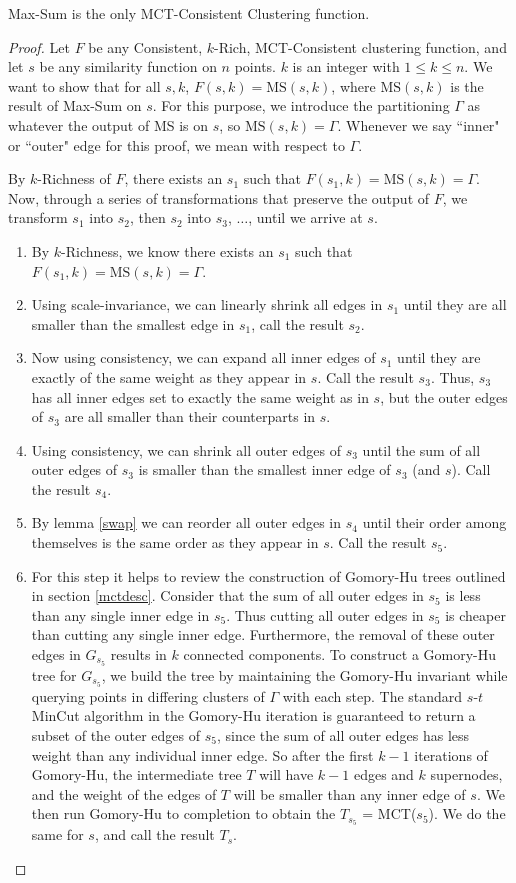 \documentclass[twoside,11pt]{article}
\newcommand{\MS}{\text{MS}}
\begin{document}
\begin{theorem} \label{mainms}
Max-Sum is the only MCT-Consistent Clustering function.
\end{theorem}
\begin{proof}
Let $F$ be any Consistent, $k$-Rich, MCT-Consistent clustering function, and let $s$ be any similarity function on $n$ points. $k$ is an integer with $1 \leq k \leq n$. We want to show that for all $s,k$, $F(s,k) = \MS(s,k)$, where $\MS(s,k)$ is the result of  Max-Sum on $s$. For this purpose, we introduce the partitioning $\Gamma$ as whatever the output of MS is on $s$, so $\MS(s,k)=\Gamma$. Whenever we say ``inner" or ``outer" edge for this proof, we mean with respect to $\Gamma$.

By $k$-Richness of $F$, there exists an $s_1$ such that $F(s_1,k) = \MS(s,k) = \Gamma$. Now, through a series of transformations that preserve the output of $F$, we transform $s_1$ into $s_2$, then $s_2$ into $s_3$, $\ldots$, until we arrive at $s$.
\begin{enumerate}
	\item By $k$-Richness, we know there exists an $s_1$ such that $F(s_1, k) = \MS(s, k) = \Gamma$.
	\item Using scale-invariance, we can linearly shrink all edges in $s_1$ until they are all smaller than the smallest edge in $s_1$, call the result $s_2$.
	\item Now using consistency, we can expand all inner edges of $s_1$ until they are exactly of the same weight as they appear in $s$. Call the result $s_3$. Thus, $s_3$ has all inner edges set to exactly the same weight as in $s$, but the outer edges of $s_3$ are all smaller than their counterparts in $s$.
	\item Using consistency, we can shrink all outer edges of $s_3$ until the sum of all outer edges of $s_3$ is smaller than the smallest inner edge of $s_3$ (and $s$). Call the result $s_4$.
	\item By lemma \ref{swap} we can reorder all outer edges in $s_4$ until their order among themselves is the same order as they appear in $s$. Call the result $s_5$.	
	\item For this step it helps to review the construction of Gomory-Hu trees outlined in section \ref{mctdesc}. 
Consider that the sum of all outer edges in $s_5$ is less than any single inner edge in $s_5$. Thus cutting all outer edges in $s_5$ is cheaper
than cutting any single inner edge. Furthermore, the removal of these outer edges in $G_{s_5}$ results in $k$ connected components. To construct a Gomory-Hu tree for $G_{s_5}$, we build the tree by maintaining the Gomory-Hu invariant while querying points in differing clusters of $\Gamma$ with each step. The standard $s$-$t$ MinCut algorithm in the Gomory-Hu iteration is guaranteed to return a subset of the outer edges of $s_5$, since the sum of all outer edges has less weight than any individual inner edge. So after the first $k-1$ iterations of Gomory-Hu, the intermediate tree $T$ will have $k-1$ edges and $k$ supernodes, and the weight of the edges of $T$ will be smaller than any inner edge of $s$. We then run Gomory-Hu to completion to obtain the $T_{s_5}$ = MCT($s_5$). We do the same for $s$, and call the result $T_s$.


\end{enumerate}
\end{proof}
\end{document}
